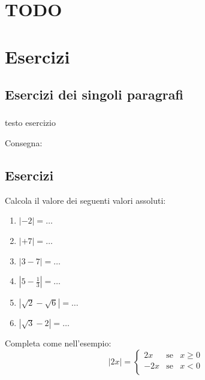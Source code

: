 
\section{TODO}

\section{Esercizi}

\subsection{Esercizi dei singoli paragrafi}

\subsubsection*{}

\begin{esercizio}
\label{ese:D.19}
testo esercizio
\end{esercizio}

\begin{esercizio}\label{ese:03.1}
Consegna:
 \begin{enumeratea}
  \item  
 \end{enumeratea}
\end{esercizio}




\subsection{Esercizi}

Calcola il valore dei seguenti valori assoluti:
\begin{enumerate}
\item $|-2|=\dots$
\item $|+7|=\dots$
\item $|3-7|=\dots$
\item $|5-\frac{1}{3}|=\dots$
\item $|\sqrt{2}-\sqrt{6}|=\dots$
\item $|\sqrt{3}-2|=\dots$
\end{enumerate}

Completa come nell'esempio:
$$
|2x|=
        \left\lbrace 
        \begin{array}{lcl}
        2x & \text{se}& x\geq 0\\
        -2x & \text{se}& x< 0\\
        \end{array}
        \right.
$$

